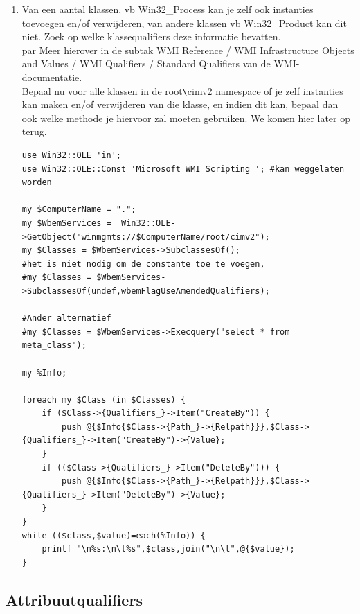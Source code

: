 \documentclass[11pt,a4paper]{report}
\begin{document}
\begin{enumerate}[resume]
\begin{lstlisting}
printf "Abstract:   %5d (+)%5d (-)\n",$Abstract   ,$nonAbstract;
printf "Association:%5d (+)%5d (-)\n",$Association,$nonAssociation;
printf "Dynamic:    %5d (+)%5d (-)\n",$Dynamic    ,$nonDynamic;
printf "Singleton:  %5d (+)%5d (-)\n",$Singleton  ,$nonSingleton;
	\end{lstlisting}
	\item Van een aantal klassen, vb Win32\_Process kan je zelf ook instanties toevoegen en/of verwijderen, van andere klassen vb Win32\_Product kan dit niet. Zoek op welke klassequalifiers deze informatie bevatten.
	\\par Meer hierover in de subtak WMI Reference / WMI Infrastructure Objects and Values / WMI Qualifiers / Standard Qualifiers van de WMI-documentatie.
	\\ Bepaal nu voor alle klassen in de root\verb+\+cimv2 namespace of je zelf instanties kan maken en/of verwijderen van die klasse, en indien dit kan, bepaal dan ook welke methode je hiervoor zal moeten gebruiken. We komen hier later op terug.
	\newpage
	\begin{lstlisting}
use Win32::OLE 'in';
use Win32::OLE::Const 'Microsoft WMI Scripting '; #kan weggelaten worden

my $ComputerName = ".";
my $WbemServices =  Win32::OLE->GetObject("winmgmts://$ComputerName/root/cimv2");
my $Classes = $WbemServices->SubclassesOf();
#het is niet nodig om de constante toe te voegen, 
#my $Classes = $WbemServices->SubclassesOf(undef,wbemFlagUseAmendedQualifiers);

#Ander alternatief
#my $Classes = $WbemServices->Execquery("select * from meta_class");

my %Info;

foreach my $Class (in $Classes) {	
	if ($Class->{Qualifiers_}->Item("CreateBy")) {
		push @{$Info{$Class->{Path_}->{Relpath}}},$Class->{Qualifiers_}->Item("CreateBy")->{Value};
	}
	if (($Class->{Qualifiers_}->Item("DeleteBy"))) {
		push @{$Info{$Class->{Path_}->{Relpath}}},$Class->{Qualifiers_}->Item("DeleteBy")->{Value};
	}
}
while (($class,$value)=each(%Info)) { 
	printf "\n%s:\n\t%s",$class,join("\n\t",@{$value});
}
	\end{lstlisting}
\end{enumerate}
\subsection{Attribuutqualifiers}
\end{document}
